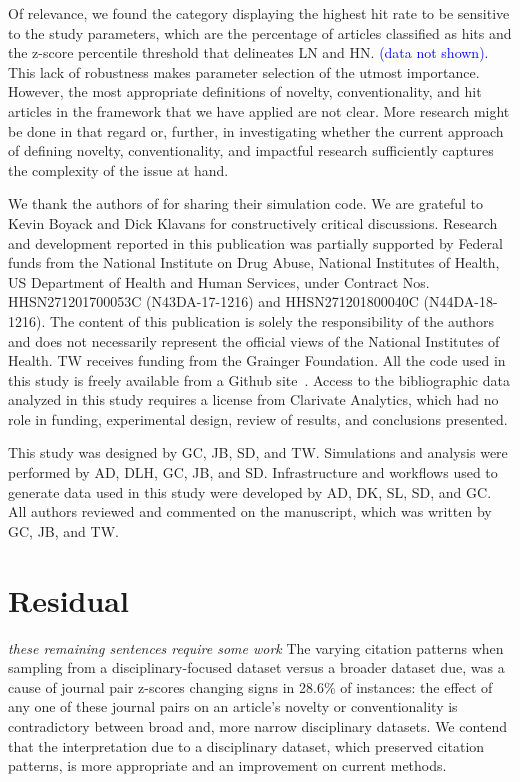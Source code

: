 \documentclass[NETN]{stjour}
\begin{document}
Of relevance, we found the category displaying the highest hit rate to be sensitive to the study parameters, which are the percentage of articles classified as hits and the z-score percentile threshold that delineates LN and HN. \textcolor{blue}{(data not shown).} This lack of robustness makes parameter selection of the utmost importance.  However, the most appropriate definitions of novelty, conventionality, and hit articles in the framework that we have applied are not clear.  More research might be done in that regard or, further, in investigating whether the current approach of defining novelty, conventionality, and impactful research sufficiently captures the complexity of the issue at hand. 

\acknowledgments
 We thank the authors of \cite{uzzi_atypical_2013} for sharing their simulation code. We are grateful to Kevin Boyack and Dick Klavans for constructively critical discussions. Research and development reported in this publication was partially supported by Federal funds from the National Institute on Drug Abuse, National Institutes of Health, US Department of Health and Human Services, under Contract Nos. HHSN271201700053C (N43DA-17-1216) and HHSN271201800040C (N44DA-18-1216). The content of this publication is solely the responsibility of the authors and does not necessarily represent the official views of the National Institutes of Health. TW receives funding from the Grainger Foundation. 
All the code used in this study is freely available from a Github site~\citep{GithubERNIE2019}. Access to the bibliographic data analyzed in this study requires a license from Clarivate Analytics, which had no role in funding, experimental design, review of results, and conclusions presented. 

\authorcontributions 
This study was designed by GC, JB, SD, and TW. Simulations and analysis were performed by AD, DLH, GC, JB, and SD. Infrastructure and workflows used to generate data used in this study were developed by AD, DK, SL, SD, and GC.  All authors reviewed and commented on the manuscript, which was written by GC, JB, and TW.




\newpage
\section{Residual}
\emph{these remaining sentences require some work}
The varying citation patterns when sampling from a disciplinary-focused dataset versus a broader dataset due, was a cause of journal pair z-scores changing signs in 28.6\% of instances: the effect of any one of these journal pairs on an article's novelty or conventionality is contradictory between broad and, more narrow disciplinary datasets. We contend that the interpretation due to a disciplinary dataset, which preserved citation patterns, is more appropriate and an improvement on current methods. 
\end{document}

